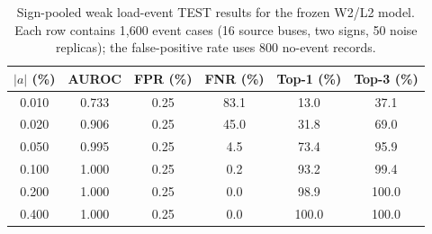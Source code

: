 \begin{table}[t]
\caption{Sign-pooled weak load-event TEST results for the frozen W2/L2 model. Each row contains 1,600 event cases (16 source buses, two signs, 50 noise replicas); the false-positive rate uses 800 no-event records.}
\label{tab:load-weak-results}
\centering
\scriptsize
\setlength{\tabcolsep}{3.2pt}
\begin{tabular}{cccccc}
\toprule
$|a|$ (\%) & AUROC & FPR (\%) & FNR (\%) & Top-1 (\%) & Top-3 (\%) \\
\midrule
0.010 & 0.733 & 0.25 & 83.1 & 13.0 & 37.1 \\
0.020 & 0.906 & 0.25 & 45.0 & 31.8 & 69.0 \\
0.050 & 0.995 & 0.25 & 4.5 & 73.4 & 95.9 \\
0.100 & 1.000 & 0.25 & 0.2 & 93.2 & 99.4 \\
0.200 & 1.000 & 0.25 & 0.0 & 98.9 & 100.0 \\
0.400 & 1.000 & 0.25 & 0.0 & 100.0 & 100.0 \\
\bottomrule
\end{tabular}
\end{table}
